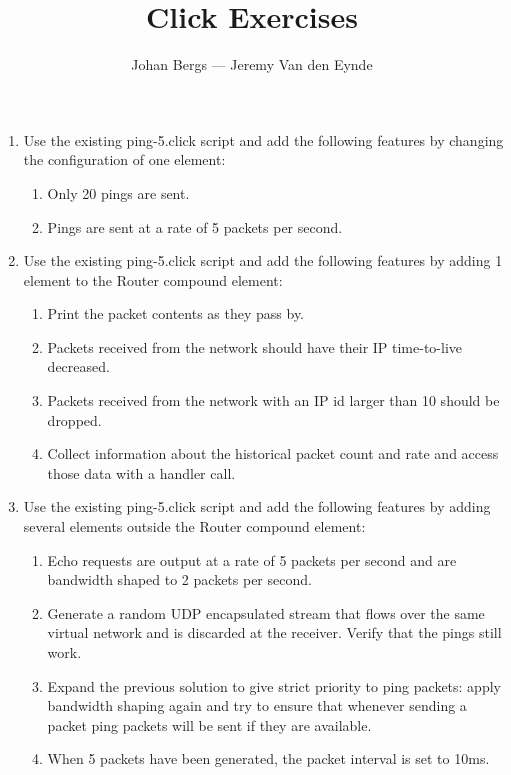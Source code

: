 \documentclass[a4paper]{article}
\author{Johan Bergs --- Jeremy Van den Eynde}
\date{}
\title{Click Exercises}
\begin{document}
\maketitle

\begin{enumerate}

\item Use the existing ping-5.click script and add the following features by changing the configuration of one element:

\begin{enumerate}
\item Only 20 pings are sent.
\item Pings are sent at a rate of 5 packets per second.
\end{enumerate}


\item Use the existing ping-5.click script and add the following features by adding 1 element to the Router compound element:

\begin{enumerate}
\item Print the packet contents as they pass by.
\item Packets received from the network should have their IP time-to-live decreased.
\item Packets received from the network with an IP id larger than 10 should be dropped.
\item Collect information about the historical packet count and rate and access those data with a handler call.
\end{enumerate}

\item Use the existing ping-5.click script and add the following features by adding several elements outside the Router compound element:

\begin{enumerate}
\item Echo requests are output at a rate of 5 packets per second and are bandwidth shaped to 2 packets per second.
\item Generate a random UDP encapsulated stream that flows over the same virtual network and is discarded at the receiver. Verify that the pings still work.
\item Expand the previous solution to give strict priority to ping packets: apply bandwidth shaping again and try to ensure that whenever sending a packet ping packets will be sent if they are available.
\item When 5 packets have been generated, the packet interval is set to 10ms.
\end{enumerate}


\end{enumerate}
\end{document}
